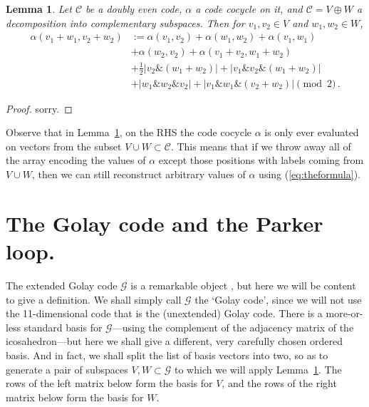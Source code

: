 \documentclass{article}
\theoremstyle{plain}
\newtheorem{lemma}{Lemma}
\theoremstyle{definition}
\def \cC {\mathcal{C}}
\def \cG {\mathcal{G}}
\def\And{\mathbin{\&}}
\def\Plus{+}
\begin{document}
\begin{lemma}\label{lemma:formula lemma}
Let $\cC$ be a doubly even code, $\alpha$ a code cocycle on it, and $\cC = V\oplus W$ a decomposition into complementary subspaces.
Then for $v_1,v_2\in V$ and $w_1,w_2\in W$,
\begin{align}\label{eq:theformula}
	\alpha(v_1\Plus w_1,v_2\Plus w_2)	
		& := \alpha(v_1,v_2)  + \alpha(w_1,w_2) + \alpha(v_1,w_1)  \\
		&+ \alpha(w_2,v_2) + \alpha(v_1\Plus v_2,w_1\Plus w_2) \nonumber \\
							& + \tfrac12|v_2\And(w_1\Plus w_2)| + |v_1\And v_2 \And (w_1\Plus w_2)| \nonumber \\
							&+|w_1\And w_2 \And v_2| + \left|v_1\And w_1 \And (v_2 \Plus  w_2)\right| \pmod 2\,. \nonumber
\end{align}
\end{lemma}

\begin{proof}
sorry.
\end{proof}

Observe that in Lemma~\ref{lemma:formula lemma}, on the RHS the code cocycle $\alpha$ is only ever evaluated on vectors from the subset $V \cup W \subset \cC$.
This means that if we throw away all of the array encoding the values of $\alpha$ except those positions with labels coming from $V\cup W$, then we can still reconstruct arbitrary values of $\alpha$ using (\ref{eq:theformula}).

\section{The Golay code and the Parker loop.}

The extended Golay code $\cG$ is a remarkable object \cite{Thompson}, but here we will be content to give a definition. 
We shall simply call $\cG$ the `Golay code', since we will not use the 11-dimensional code that is the (unextended) Golay code.
There is a more-or-less standard basis for $\cG$---using the complement of the adjacency matrix of the icosahedron---but here we shall give a different, very carefully chosen ordered basis.
And in fact, we shall split the list of basis vectors into two, so as to generate a pair of subspaces $V,W\subset \cG$ to which we will apply Lemma~\ref{lemma:formula lemma}.
The rows of the left matrix below form the basis for $V$, and the rows of the right matrix below form the basis for $W$.
\end{document}
